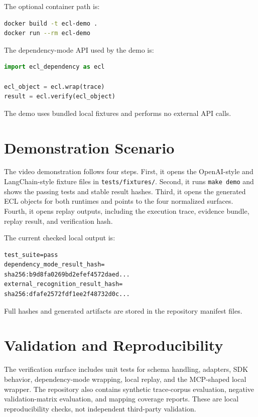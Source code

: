 \documentclass[10pt,conference]{IEEEtran}
\begin{document}
The optional container path is:

\begin{lstlisting}[language=bash]
docker build -t ecl-demo .
docker run --rm ecl-demo
\end{lstlisting}

The dependency-mode API used by the demo is:

\begin{lstlisting}[language=Python]
import ecl_dependency as ecl

ecl_object = ecl.wrap(trace)
result = ecl.verify(ecl_object)
\end{lstlisting}

The demo uses bundled local fixtures and performs no external API calls.

\section{Demonstration Scenario}

The video demonstration follows four steps. First, it opens the OpenAI-style and LangChain-style fixture files in \texttt{tests/fixtures/}. Second, it runs \texttt{make demo} and shows the passing tests and stable result hashes. Third, it opens the generated ECL objects for both runtimes and points to the four normalized surfaces. Fourth, it opens replay outputs, including the execution trace, evidence bundle, replay result, and verification hash.

The current checked local output is:

\begin{lstlisting}
test_suite=pass
dependency_mode_result_hash=
sha256:b9d8fa0269bd2efef4572daed...
external_recognition_result_hash=
sha256:dfafe2572fdf1ee2f48732d0c...
\end{lstlisting}

Full hashes and generated artifacts are stored in the repository manifest files.

\section{Validation and Reproducibility}

The verification surface includes unit tests for schema handling, adapters, SDK behavior, dependency-mode wrapping, local replay, and the MCP-shaped local wrapper. The repository also contains synthetic trace-corpus evaluation, negative validation-matrix evaluation, and mapping coverage reports. These are local reproducibility checks, not independent third-party validation.
\end{document}
